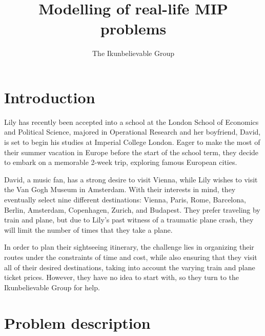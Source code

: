 \documentclass{extarticle}
\title{Modelling of real-life MIP problems}
\author{The Ikunbelievable Group\footnotemark[1]}
\date{}
\begin{document}
\maketitle

\renewcommand{\thefootnote}{\fnsymbol{footnote}}
\renewcommand{\thefootnote}{\arabic{footnote}}

\section{Introduction}

Lily has recently been accepted into a school at the London School of Economics
and Political Science, majored in Operational Research and her boyfriend,
David, is set to begin his studies at Imperial College London. Eager to make
the most of their summer vacation in Europe before the start of the school
term, they decide to embark on a memorable 2-week trip, exploring famous
European cities.

David, a music fan, has a strong desire to visit Vienna, while Lily wishes to
visit the Van Gogh Museum in Amsterdam. With their interests in mind, they
eventually select nine different destinations: Vienna, Paris, Rome, Barcelona,
Berlin, Amsterdam, Copenhagen, Zurich, and Budapest. They prefer traveling by
train and plane, but due to Lily's past witness of a traumatic plane crash,
they will limit the number of times that they take a plane.

In order to plan their sightseeing itinerary, the challenge lies in organizing their routes under the constraints of time and cost, while also ensuring that they visit all of their desired destinations, taking into account the varying train and plane ticket prices. However, they have
no idea to start with, so they turn to the Ikunbelievable Group for help.

\section{Problem description}
\end{document}
